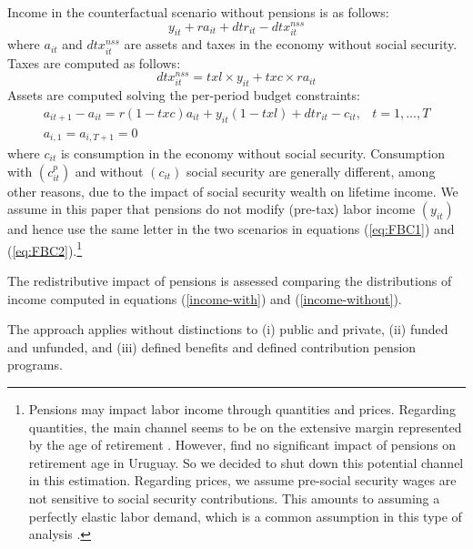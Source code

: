 \documentclass{article}
\begin{document}
\begin{enumerate}
Income in the counterfactual scenario without pensions is as follows:
    \begin{equation} \label{income-without}
		 y_{it} + ra_{it} + dtr_{it} - dtx^{nss}_{it}  
    \end{equation}
    where  $a_{it}$ and $dtx^{nss}_{it}$ are assets and taxes in the economy without social security. Taxes are computed as follows:
    \begin{equation}
        dtx^{nss}_{it} = txl \times y_{it} +   txc\times r a_{it}
    \end{equation}
    Assets are computed solving the per-period budget constraints:
  \begin{equation} \label{eq:FBC2} 
    \begin{array}{ll}
     a_{it+1} - a_{it} = r (1-txc) a_{it} + y_{it}(1-txl) + dtr_{it} - c_{it}    	, & t=1,...,T 	\\ 
  a_{i,1} =  a_{i,T+1} =0
    \end{array}
    \end{equation}
where $c_{it} $ is consumption in the economy without social security. Consumption with $(c_{it}^p)$ and without $(c_{it})$ social security are generally different, among other reasons, due to the impact of social security wealth on lifetime income. We assume in this paper that pensions do not modify (pre-tax) labor income $(y_{it})$ and hence use the same letter in the two scenarios in equations (\ref{eq:FBC1}) and (\ref{eq:FBC2}).\footnote{Pensions may impact labor income through quantities and prices. Regarding quantities, the main channel seems to be on the extensive margin represented by the age of retirement \parencite{Gruber1999a, Gruber2002}. However, \textcite{Alvarez2010, Alvarez2012, Forteza2015b} find no significant impact of pensions on retirement age in Uruguay. So we decided to shut down this potential channel in this estimation.  Regarding prices, we assume pre-social security wages are not sensitive to social security contributions. This amounts to assuming a perfectly elastic labor demand, which is a common assumption in this type of analysis \parencite{Gruber1999a, Brown2009b, Filer1996}. }\label{foot:labordemand} 
\end{enumerate}

The redistributive impact of pensions is assessed comparing the distributions of income computed in equations (\ref{income-with}) and (\ref{income-without}). 

The approach applies without distinctions to (i) public and private, (ii) funded and unfunded, and (iii) defined benefits and defined contribution pension programs.   
\end{document}
